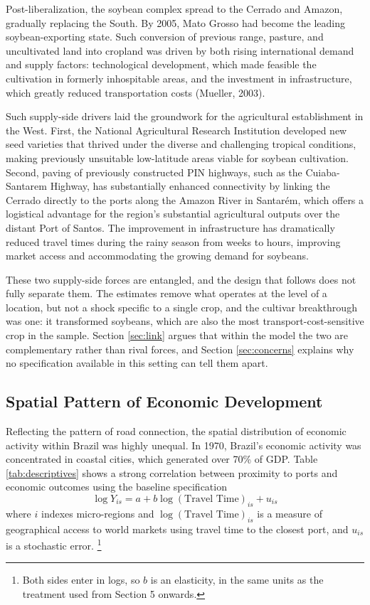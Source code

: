 \documentclass[11pt]{article}
\begin{document}
Post-liberalization, the soybean complex spread to the Cerrado and Amazon, gradually replacing the South. By 2005, Mato Grosso had become the leading soybean-exporting state. Such conversion of previous range, pasture, and uncultivated land into cropland was driven by both rising international demand and supply factors: technological development, which made feasible the cultivation in formerly inhospitable areas, and the investment in infrastructure, which greatly reduced transportation costs (Mueller, 2003).

Such supply-side drivers laid the groundwork for the agricultural establishment in the West. First, the National Agricultural Research Institution developed new seed varieties that thrived under the diverse and challenging tropical conditions, making previously unsuitable low-latitude areas viable for soybean cultivation. Second, paving of previously constructed PIN highways, such as the Cuiaba-Santarem Highway, has substantially enhanced connectivity by linking the Cerrado directly to the ports along the Amazon River in Santarém, which offers a logistical advantage for the region’s substantial agricultural outputs over the distant Port of Santos. The improvement in infrastructure has dramatically reduced travel times during the rainy season from weeks to hours, improving market access and accommodating the growing demand for soybeans.

These two supply-side forces are entangled, and the design that follows does not fully separate them. The estimates remove what operates at the level of a location, but not a shock specific to a single crop, and the cultivar breakthrough was one: it transformed soybeans, which are also the most transport-cost-sensitive crop in the sample. Section \ref{sec:link} argues that within the model the two are complementary rather than rival forces, and Section \ref{sec:concerns} explains why no specification available in this setting can tell them apart. 

\subsection{Spatial Pattern of Economic Development}
Reflecting the pattern of road connection, the spatial distribution of economic activity within Brazil was highly unequal. In 1970, Brazil’s economic activity was concentrated in coastal cities, which generated over 70\% of GDP. 
Table \ref{tab:descriptives} shows a strong correlation between proximity to ports and economic outcomes using the baseline specification
\begin{equation}
    \log Y_{is} = a+b \log(\text{Travel Time})_{is}+u_{is}
\end{equation}
where $i$ indexes micro-regions and $\log(\text{Travel Time})_{is}$ is a measure of geographical access to world markets using travel time to the closest port, and $u_{is}$ is a stochastic error. \footnote{Both sides enter in logs, so $b$ is an elasticity, in the same units as the treatment used from Section 5 onwards. }
\end{document}
